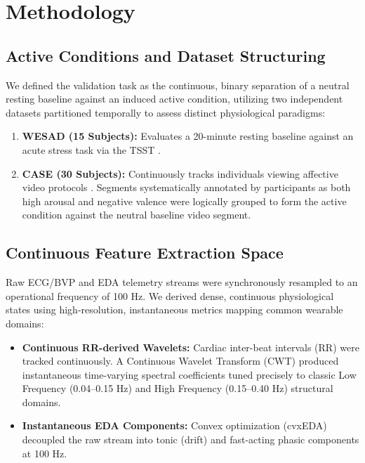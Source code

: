 \documentclass{IEEE_lsens}
\begin{document}
\section{Methodology}

\subsection{Active Conditions and Dataset Structuring}
We defined the validation task as the continuous, binary separation of a neutral resting baseline against an induced active condition, utilizing two independent datasets partitioned temporally to assess distinct physiological paradigms:
\begin{enumerate}
    \item \textbf{WESAD (15 Subjects):} Evaluates a 20-minute resting baseline against an acute stress task via the TSST \cite{schmidt2018wesad}. 
    \item \textbf{CASE (30 Subjects):} Continuously tracks individuals viewing affective video protocols \cite{sharma2019}. Segments systematically annotated by participants as both high arousal and negative valence were logically grouped to form the active condition against the neutral baseline video segment.
\end{enumerate}

\subsection{Continuous Feature Extraction Space}
Raw ECG/BVP and EDA telemetry streams were synchronously resampled to an operational frequency of 100 Hz. We derived dense, continuous physiological states using high-resolution, instantaneous metrics mapping common wearable domains:
\begin{itemize}
    \item \textbf{Continuous RR-derived Wavelets:} Cardiac inter-beat intervals (RR) were tracked continuously. A Continuous Wavelet Transform (CWT) produced instantaneous time-varying spectral coefficients tuned precisely to classic Low Frequency (0.04--0.15 Hz) and High Frequency (0.15--0.40 Hz) structural domains.
    \item \textbf{Instantaneous EDA Components:} Convex optimization (cvxEDA) \cite{cvxeda2015} decoupled the raw stream into tonic (drift) and fast-acting phasic components at 100 Hz.
\end{itemize}
\end{document}

